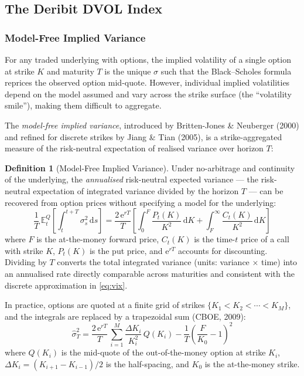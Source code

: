 \documentclass[12pt, a4paper]{article}
\theoremstyle{plain}
\theoremstyle{definition}
\newtheorem{definition}{Definition}[section]
\newcommand{\E}{\mathbb{E}}
\begin{document}
\subsection{The Deribit DVOL Index}
\label{sec:dvol}

\subsubsection{Model-Free Implied Variance}

For any traded underlying with options, the implied volatility of a single
option at strike $K$ and maturity $T$ is the unique $\sigma$ such that the
Black--Scholes formula reprices the observed option mid-quote. However,
individual implied volatilities depend on the model assumed and vary
across the strike surface (the ``volatility smile''), making them
difficult to aggregate.

The \emph{model-free implied variance}, introduced by
Britten-Jones \& Neuberger (2000) and refined for discrete strikes
by Jiang \& Tian (2005), is a strike-aggregated measure of the
risk-neutral expectation of realised variance over horizon $T$:

\begin{definition}[Model-Free Implied Variance]
Under no-arbitrage and continuity of the underlying, the
\emph{annualised} risk-neutral expected variance --- the risk-neutral
expectation of integrated variance divided by the horizon $T$ --- can be
recovered from option prices without specifying a model for the underlying:
\[
  \frac{1}{T}\,\E^Q_t\!\left[\int_t^{t+T} \sigma_s^2\,\mathrm{d}s\right]
  = \frac{2\,\mathrm{e}^{rT}}{T}\!\left[
    \int_0^F \frac{P_t(K)}{K^2}\,\mathrm{d}K
    + \int_F^\infty \frac{C_t(K)}{K^2}\,\mathrm{d}K
  \right]
\]
where $F$ is the at-the-money forward price, $C_t(K)$ is the time-$t$
price of a call with strike $K$, $P_t(K)$ is the put price, and
$\mathrm{e}^{rT}$ accounts for discounting.  Dividing by $T$ converts
the total integrated variance (units: variance $\times$ time) into an
annualised rate directly comparable across maturities and consistent
with the discrete approximation in \eqref{eq:vix}.
\end{definition}

In practice, options are quoted at a finite grid of strikes
$\{K_1 < K_2 < \cdots < K_M\}$, and the integrals are replaced by
a trapezoidal sum (CBOE, 2009):
\begin{equation}
  \hat{\sigma}^2_{T} = \frac{2\,\mathrm{e}^{rT}}{T}\,
                       \sum_{i=1}^{M} \frac{\Delta K_i}{K_i^2}\,Q(K_i)
                       - \frac{1}{T}\!\left(\frac{F}{K_0} - 1\right)^{\!2}
  \label{eq:vix}
\end{equation}
where $Q(K_i)$ is the mid-quote of the out-of-the-money option at strike
$K_i$, $\Delta K_i = (K_{i+1} - K_{i-1})/2$ is the half-spacing, and
$K_0$ is the at-the-money strike.
\end{document}
